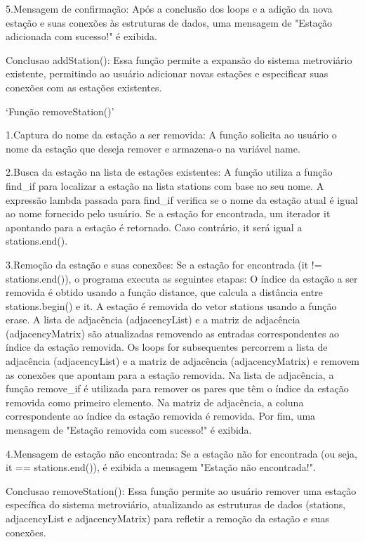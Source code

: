 5.Mensagem de confirmação:
Após a conclusão dos loops e a adição da nova estação e suas conexões às estruturas de dados, uma mensagem de "Estação adicionada com sucesso!" é exibida.

Conclusao addStation(): 
Essa função permite a expansão do sistema metroviário existente,
permitindo ao usuário adicionar novas estações e especificar suas conexões 
com as estações existentes.

`Função removeStation()'

1.Captura do nome da estação a ser removida:
A função solicita ao usuário o nome da estação que deseja remover e armazena-o na variável name.

2.Busca da estação na lista de estações existentes:
A função utiliza a função find_if para localizar a estação na lista stations com base no seu nome. A expressão lambda passada para find_if verifica se o nome da estação atual é igual ao nome fornecido pelo usuário.
Se a estação for encontrada, um iterador it apontando para a estação é retornado. Caso contrário, it será igual a stations.end().

3.Remoção da estação e suas conexões:
Se a estação for encontrada (it != stations.end()), o programa executa as seguintes etapas:
O índice da estação a ser removida é obtido usando a função distance, que calcula a distância entre stations.begin() e it.
A estação é removida do vetor stations usando a função erase.
A lista de adjacência (adjacencyList) e a matriz de adjacência (adjacencyMatrix) são atualizadas removendo as entradas correspondentes ao índice da estação removida.
Os loops for subsequentes percorrem a lista de adjacência (adjacencyList) e a matriz de adjacência (adjacencyMatrix) e removem as conexões que apontam para a estação removida.
Na lista de adjacência, a função remove_if é utilizada para remover os pares que têm o índice da estação removida como primeiro elemento.
Na matriz de adjacência, a coluna correspondente ao índice da estação removida é removida.
Por fim, uma mensagem de "Estação removida com sucesso!" é exibida.

4.Mensagem de estação não encontrada:
Se a estação não for encontrada (ou seja, it == stations.end()), é exibida a mensagem "Estação não encontrada!".

Conclusao removeStation():
Essa função permite ao usuário remover uma estação específica do sistema metroviário, 
atualizando as estruturas de dados (stations, adjacencyList e adjacencyMatrix) para refletir a remoção da estação e suas conexões. 

